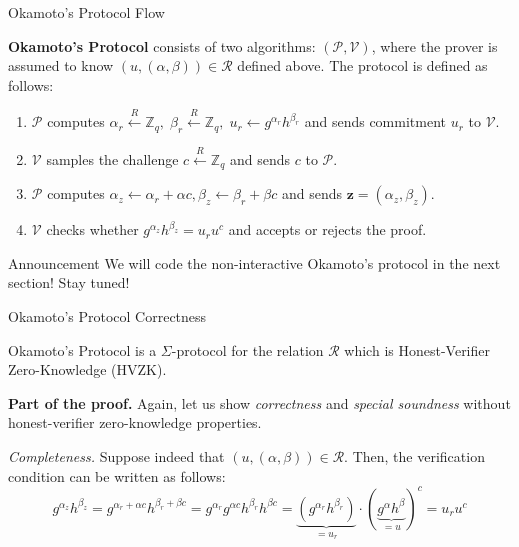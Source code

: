\documentclass{zkdl-presentation-template}
\begin{document}
    \begin{frame}{Okamoto's Protocol Flow}
        \begin{definition}
            \textbf{Okamoto's Protocol} consists of two algorithms: $(\mathcal{P}, \mathcal{V})$, where the prover is assumed to know $(u,(\alpha,\beta)) \in \mathcal{R}$ defined above. The protocol is defined as follows:
            \begin{enumerate}
                \item $\mathcal{P}$ computes $\alpha_r \xleftarrow{R} \mathbb{Z}_q, \; \beta_r \xleftarrow{R} \mathbb{Z}_q, \; u_r \gets g^{\alpha_r}h^{\beta_r}$ and sends commitment $u_r$ to $\mathcal{V}$.
                \item $\mathcal{V}$ samples the challenge $c \xleftarrow{R} \mathbb{Z}_q$ and sends $c$ to $\mathcal{P}$.
                \item $\mathcal{P}$ computes $\alpha_z \gets \alpha_r + \alpha c, \beta_z \gets \beta_r + \beta c$ and sends $\mathbf{z} = (\alpha_z,\beta_z)$.
                \item $\mathcal{V}$ checks whether $g^{\alpha_z}h^{\beta_z} = u_r u^c$ and accepts or rejects the proof.
            \end{enumerate}
        \end{definition}

        \begin{alertblock}{Announcement}
            We will code the non-interactive Okamoto's protocol in the next section! Stay tuned!
        \end{alertblock}
    \end{frame}

    \begin{frame}{Okamoto's Protocol Correctness}
        \begin{theorem}
            Okamoto's Protocol is a $\Sigma$-protocol for the relation $\mathcal{R}$ which is Honest-Verifier Zero-Knowledge (HVZK).
        \end{theorem}
        
        \textbf{Part of the proof.} Again, let us show \textit{correctness} and \textit{special soundness} without honest-verifier zero-knowledge properties.
        
        \textit{Completeness.} Suppose indeed that $(u,(\alpha,\beta)) \in \mathcal{R}$. Then, the verification condition can be written as follows:
        \begin{equation*}
            g^{\alpha_z}h^{\beta_z} = g^{\alpha_r + \alpha c}h^{\beta_r + \beta c} = g^{\alpha_r}g^{\alpha c}h^{\beta_r}h^{\beta c} = \underbrace{(g^{\alpha_r}h^{\beta_r})}_{=u_r} \cdot (\underbrace{g^{\alpha}h^{\beta}}_{=u})^c = u_r u^c
        \end{equation*}
    \end{frame}
\end{document}
